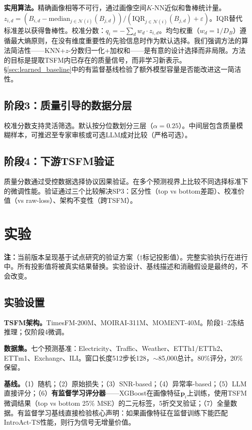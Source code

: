\documentclass{article}
\begin{document}
\textbf{实用算法。}精确画像相等不可行，通过画像空间$K$-NN近似和鲁棒统计量。$z_{i,d} = (B_{i,d} - \text{median}_{j\in\mathcal{N}(i)}(B_{j,d})) / (\text{IQR}_{j\in\mathcal{N}(i)}(B_{j,d}) + \varepsilon)$。IQR替代标准差以获得鲁棒性。校准分数：$q_i = -\sum_{d} w_d \cdot z_{i,d}$。均匀权重（$w_d = 1/D_B$）遵循最大熵原则，在没有维度重要性的先验信息时作为默认选择。我们强调方法的算法简洁性——KNN+$z$-分数归一化+加权和——是有意的设计选择而非局限。方法的目标是提取TSFM内已存在的质量信号，而非学习新表示。\S\ref{sec:learned_baseline}中的有监督基线检验了额外模型容量是否能改进这一简洁性。

\subsection{阶段3：质量引导的数据分层}

校准分数支持灵活筛选。默认按分位数划分三层（$\alpha = 0.25$）。中间层包含质量模糊样本，可推迟至专家审核或可选LLM成对比较（严格可选）。

\subsection{阶段4：下游TSFM验证}

质量分数通过受控数据选择协议因果验证。在多个预测视界上比较不同选择标准下的微调性能。验证通过三个比较解决SP3：区分性（top vs bottom差距）、校准价值（vs raw-loss）、架构不变性（跨TSFM）。

\section{实验}
\label{sec:experiments}

\textbf{注：}当前版本呈现基于试点研究的验证方案（$\dagger$标记投影值）。完整实验执行在进行中。所有投影值将被真实结果替换。实验设计、基线描述和消融假设是最终的，不会改变。

\subsection{实验设置}

\textbf{TSFM架构。}TimesFM-200M、MOIRAI-311M、MOMENT-40M。阶段1--2冻结推理；仅阶段4微调。

\textbf{数据集。}七个预测基准：Electricity、Traffic、Weather、ETTh1/ETTh2、ETTm1、Exchange、ILI。窗口长度512步长128，$\sim$85,000总计。80\%评分，20\%保留。

\textbf{基线。}（1）随机；（2）原始损失；（3）SNR-based；（4）异常率-based；（5）LLM直接评分；（6）\textbf{有监督学习评分器}——XGBoost在画像特征$\mathbf{p}_i$上训练，使用TSFM微调结果（top vs bottom 25\% MSE）的二元标签，5折交叉验证；（7）全量数据。有监督学习基线直接检验核心声明：如果画像特征在监督训练下能匹配IntroAct-TS性能，则行为信号无增量价值。
\end{document}

